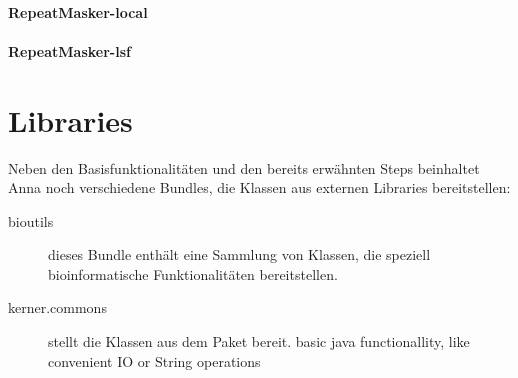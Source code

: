 \paragraph{RepeatMasker-local}

\paragraph{RepeatMasker-lsf}

\section{Libraries}
Neben den Basisfunktionalitäten und den bereits erwähnten Steps
beinhaltet Anna noch verschiedene Bundles, die Klassen aus externen Libraries
bereitstellen:
\begin{description}
\item[bioutils] dieses Bundle enthält eine Sammlung
von Klassen, die speziell bioinformatische Funktionalitäten bereitstellen.
\item[kerner.commons] stellt die Klassen aus dem Paket
 bereit. basic java functionallity, like convenient IO or
String operations
\end{description}
